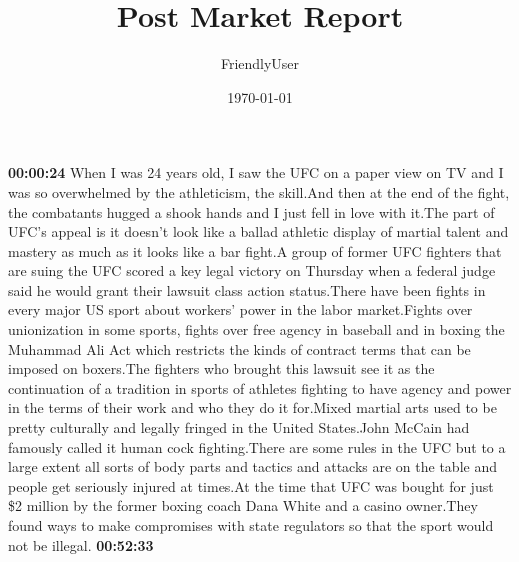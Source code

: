 \documentclass{article}%
\title{Post Market Report}%
\author{FriendlyUser}%
\date{\today}%
\begin{document}
%
\normalsize%
\textbf{00:00:24}%
When I was 24 years old, I saw the UFC on a paper view on TV and I was so overwhelmed by the athleticism, the skill.And then at the end of the fight, the combatants hugged a shook hands and I just fell in love with it.The part of UFC's appeal is it doesn't look like a ballad athletic display of martial talent and mastery as much as it looks like a bar fight.A group of former UFC fighters that are suing the UFC scored a key legal victory on Thursday when a federal judge said he would grant their lawsuit class action status.There have been fights in every major US sport about workers' power in the labor market.Fights over unionization in some sports, fights over free agency in baseball and in boxing the Muhammad Ali Act which restricts the kinds of contract terms that can be imposed on boxers.The fighters who brought this lawsuit see it as the continuation of a tradition in sports of athletes fighting to have agency and power in the terms of their work and who they do it for.Mixed martial arts used to be pretty culturally and legally fringed in the United States.John McCain had famously called it human cock fighting.There are some rules in the UFC but to a large extent all sorts of body parts and tactics and attacks are on the table and people get seriously injured at times.At the time that UFC was bought for just \$2 million by the former boxing coach Dana White and a casino owner.They found ways to make compromises with state regulators so that the sport would not be illegal.%
\textbf{00:52:33}%
\end{document}

